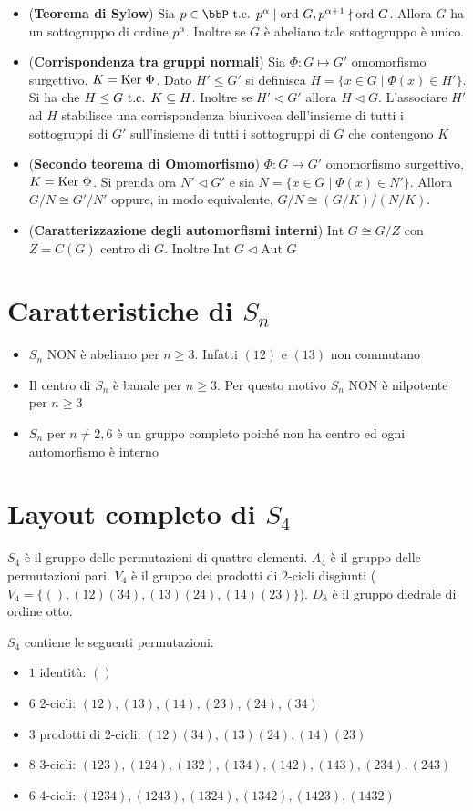 \documentclass[a4paper,NoNotes,GeneralMath]{stdmdoc}
\newcommand{\Ord}{\text{ord }}
\newcommand{\sgr}{\le}
\newcommand{\nrm}{\lhd}
\newcommand{\Int}{\text{Int }}
\newcommand{\Aut}{\text{Aut }}
\begin{document}
\begin{itemize}
		\item ({\bf Teorema di Sylow}) Sia $p \in \bbP \tc p^\alpha \mid \Ord G, p^{\alpha + 1} \nmid \Ord G$. Allora $G$ ha un sottogruppo di ordine $p^\alpha$. Inoltre se $G$ è abeliano tale sottogruppo è unico.
		\item ({\bf Corrispondenza tra gruppi normali}) Sia $\Phi: G \mapsto G'$ omomorfismo surgettivo. $K = \mbox{Ker } \Phi$. Dato $H' \sgr G'$ si definisca $H = \{x\in G \mid \Phi(x) \in H'\}$. \\ Si ha che $H \sgr G \tc K \subseteq H$. Inoltre se $H' \nrm G'$ allora $H \nrm G$. L'associare $H'$ ad $H$ stabilisce una corrispondenza biunivoca dell'insieme di tutti i sottogruppi di $G'$ sull'insieme di tutti i sottogruppi di $G$ che contengono $K$
		\item ({\bf Secondo teorema di Omomorfismo}) $\Phi: G \mapsto G'$ omomorfismo surgettivo, $K = \mbox{Ker } \Phi$. Si prenda ora $N' \nrm G'$ e sia $N = \{x \in G \mid \Phi(x) \in N'\}$. Allora $G/N \cong G'/N'$ oppure, in modo equivalente, $G/N \cong (G/K)/(N/K)$.
		\item ({\bf Caratterizzazione degli automorfismi interni}) $\Int G \cong G/Z$ con $Z = C(G)$ centro di $G$. Inoltre $\Int G \nrm \Aut G$
	\end{itemize}

	\section*{Caratteristiche di $S_n$}
	\begin{itemize}
		\item $S_n$ NON è abeliano per $n \ge 3$. Infatti $(1 2)$ e $(1 3)$ non commutano
		\item Il centro di $S_n$ è banale per $n \ge 3$. Per questo motivo $S_n$ NON è nilpotente per $n \ge 3$
		\item $S_n$ per $n\neq 2,6$ è un gruppo completo poiché non ha centro ed ogni automorfismo è interno
	\end{itemize}

	\section*{Layout completo di $S_4$}
	$S_4$ è il gruppo delle permutazioni di quattro elementi. $A_4$ è il gruppo delle permutazioni pari. $V_4$ è il gruppo dei prodotti di 2-cicli disgiunti ($V_4 = \{(), (12)(34), (13)(24), (14)(23)\}$). $D_8$ è il gruppo diedrale di ordine otto.

	$S_4$ contiene le seguenti permutazioni:
	\begin{itemize}
		\item $1$ identità: $()$
		\item $6$ 2-cicli: $(12), (13), (14), (23), (24), (34)$
		\item $3$ prodotti di 2-cicli: $(12)(34), (13)(24), (14)(23)$
		\item $8$ 3-cicli: $(123), (124), (132), (134), (142), (143), (234), (243)$
		\item $6$ 4-cicli: $(1234), (1243), (1324), (1342), (1423), (1432)$
	\end{itemize}
\end{document}
